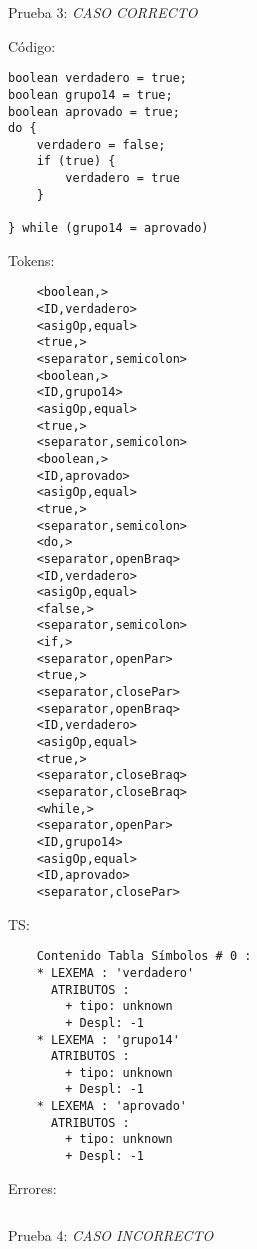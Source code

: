 \documentclass{article}
\begin{document}
Prueba 3: \textit{CASO CORRECTO}%
\begin{flushleft}
Código:
\begin{verbatim}
boolean verdadero = true;
boolean grupo14 = true;
boolean aprovado = true;
do {
    verdadero = false;
    if (true) {
        verdadero = true
    }

} while (grupo14 = aprovado)
\end{verbatim}

Tokens:
\begin{verbatim}
    <boolean,>
    <ID,verdadero>
    <asigOp,equal>
    <true,>
    <separator,semicolon>
    <boolean,>
    <ID,grupo14>
    <asigOp,equal>
    <true,>
    <separator,semicolon>
    <boolean,>
    <ID,aprovado>
    <asigOp,equal>
    <true,>
    <separator,semicolon>
    <do,>
    <separator,openBraq>
    <ID,verdadero>
    <asigOp,equal>
    <false,>
    <separator,semicolon>
    <if,>
    <separator,openPar>
    <true,>
    <separator,closePar>
    <separator,openBraq>
    <ID,verdadero>
    <asigOp,equal>
    <true,>
    <separator,closeBraq>
    <separator,closeBraq>
    <while,>
    <separator,openPar>
    <ID,grupo14>
    <asigOp,equal>
    <ID,aprovado>
    <separator,closePar>    
\end{verbatim}
    TS:
\begin{verbatim}
    Contenido Tabla Símbolos # 0 :
    * LEXEMA : 'verdadero'
      ATRIBUTOS :
        + tipo: unknown
        + Despl: -1
    * LEXEMA : 'grupo14'
      ATRIBUTOS :
        + tipo: unknown
        + Despl: -1
    * LEXEMA : 'aprovado'
      ATRIBUTOS :
        + tipo: unknown
        + Despl: -1
\end{verbatim}
Errores:
\begin{verbatim}

\end{verbatim}
\end{flushleft}
Prueba 4: \textit{CASO INCORRECTO}%
\end{document}
